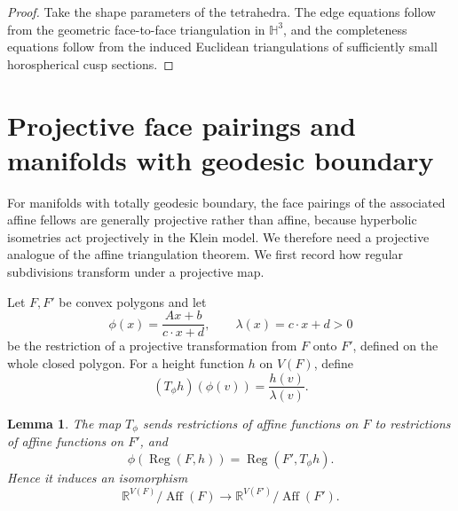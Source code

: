 \documentclass[oneside,a4paper,12pt]{article}
\newcommand{\R}{\mathbb R}
\renewcommand{\H}{\mathbb{H}}
\newcommand{\Aff}{\operatorname{Aff}}
\newcommand{\Reg}{\operatorname{Reg}}
\theoremstyle{plain}
\newtheorem{lemma}[theorem]{Lemma}
\theoremstyle{definition}
\theoremstyle{remark}
\numberwithin{equation}{section}
\begin{document}
\begin{proof}
Take the shape parameters of the tetrahedra. The edge equations follow from the geometric face-to-face triangulation in $\H^3$, and the completeness equations follow from the induced Euclidean triangulations of sufficiently small horospherical cusp sections.
\end{proof}

\section{Projective face pairings and manifolds with geodesic boundary}\label{section:projective}
For manifolds with totally geodesic boundary, the face pairings of the associated affine fellows are generally projective rather than affine, because hyperbolic isometries act projectively in the Klein model. We therefore need a projective analogue of the affine triangulation theorem. We first record how regular subdivisions transform under a projective map.

Let $F,F'$ be convex polygons and let
\begin{equation}\label{equation:projective-map}
\phi(x)=\frac{Ax+b}{c\cdot x+d},\qquad \lambda(x)=c\cdot x+d>0
\end{equation}
be the restriction of a projective transformation from $F$ onto $F'$, defined on the whole closed polygon. For a height function $h$ on $V(F)$, define
\begin{equation}\label{equation:projective-transport}
(T_\phi h)(\phi(v))=\frac{h(v)}{\lambda(v)}.
\end{equation}

\begin{lemma}\label{lemma:projective-transport}
The map $T_\phi$ sends restrictions of affine functions on $F$ to restrictions of affine functions on $F'$, and
\begin{equation}
\phi(\Reg(F,h))=\Reg(F',T_\phi h).
  \nonumber \end{equation}
Hence it induces an isomorphism
\begin{equation}
\R^{V(F)}/\Aff(F)\longrightarrow\R^{V(F')}/\Aff(F').
  \nonumber \end{equation}
\end{lemma}
\end{document}
